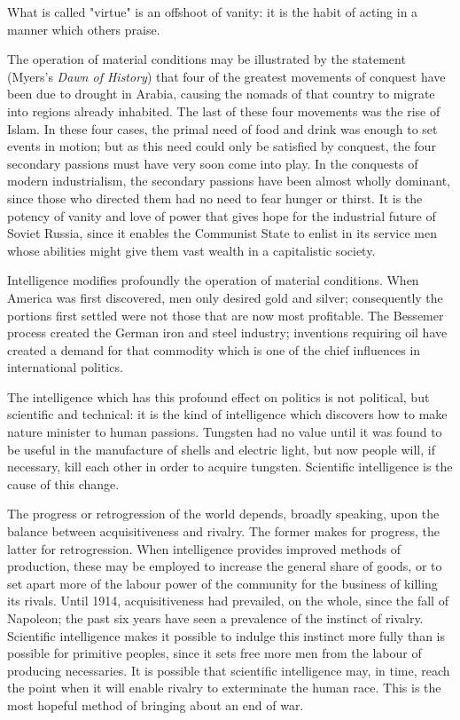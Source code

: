 What is called "virtue" is an offshoot of vanity: it is the habit of acting in a manner which others praise.

The operation of material conditions may be illustrated by the statement (Myers's \emph{Dawn of History}) that four of the greatest movements of conquest have been due to drought in Arabia, causing the nomads of that country to migrate into regions already inhabited. The last of these four movements was the rise of Islam. In these four cases, the primal need of food and drink was enough to set events in motion; but as this need could only be satisfied by conquest, the four secondary passions must have very soon come into play. In the conquests of modern industrialism, the secondary passions have been almost wholly dominant, since those who directed them had no need to fear hunger or thirst. It is the potency of vanity and love of power that gives hope for the industrial future of Soviet Russia, since it enables the Communist State to enlist in its service men whose abilities might give them vast wealth in a capitalistic society.

Intelligence modifies profoundly the operation of material conditions. When America was first discovered, men only desired gold and silver; consequently the portions first settled were not those that are now most profitable. The Bessemer process created the German iron and steel industry; inventions requiring oil have created a demand for that commodity which is one of the chief influences in international politics.

The intelligence which has this profound effect on politics is not political, but scientific and technical: it is the kind of intelligence which discovers how to make nature minister to human passions. Tungsten had no value until it was found to be useful in the manufacture of shells and electric light, but now people will, if necessary, kill each other in order to acquire tungsten. Scientific intelligence is the cause of this change.

The progress or retrogression of the world depends, broadly speaking, upon the balance between acquisitiveness and rivalry. The former makes for progress, the latter for retrogression. When intelligence provides improved methods of production, these may be employed to increase the general share of goods, or to set apart more of the labour power of the community for the business of killing its rivals. Until 1914, acquisitiveness had prevailed, on the whole, since the fall of Napoleon; the past six years have seen a prevalence of the instinct of rivalry. Scientific intelligence makes it possible to indulge this instinct more fully than is possible for primitive peoples, since it sets free more men from the labour of producing necessaries. It is possible that scientific intelligence may, in time, reach the point when it will enable rivalry to exterminate the human race. This is the most hopeful method of bringing about an end of war.

